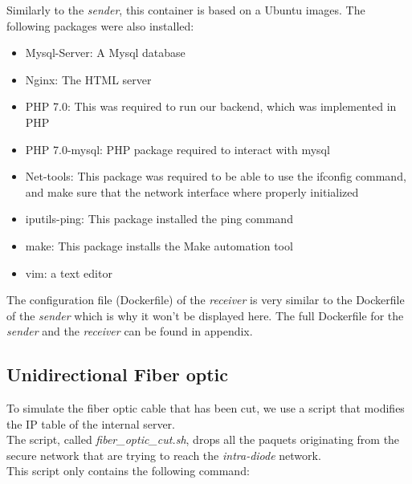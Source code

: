 \documentclass[a4paper,11pt]{article}
\begin{document}
Similarly to the \textit{sender}, this container is based on a Ubuntu images. The following packages were also installed:

\begin{itemize}
	\item{Mysql-Server: A Mysql database}
	\item{Nginx: The HTML server}
	\item{PHP 7.0: This was required to run our backend, which was implemented in PHP}
	\item{PHP 7.0-mysql: PHP package required to interact with mysql}
	\item{Net-tools: This package was required to be able to use the ifconfig command, and make sure that the network interface where properly initialized}
	\item{iputils-ping: This package installed the ping command}
	\item{make: This package installs the Make automation tool}
	\item{vim: a text editor}
\end{itemize}

The configuration file (Dockerfile) of the \textit{receiver} is very similar to the Dockerfile of the \textit{sender} which is why it won't be displayed here. The full Dockerfile for the \textit{sender} and the \textit{receiver} can be found in appendix.

\subsection{Unidirectional Fiber optic}
\label{sec:unidirectional}
To simulate the fiber optic cable that has been cut, we use a script that modifies the IP table of the internal server.\\

The script, called \textit{fiber\_optic\_cut.sh}, drops all the paquets originating from the secure network that are trying to reach the \textit{intra-diode} network.\\

This script only contains the following command:\\
%
\end{document}
